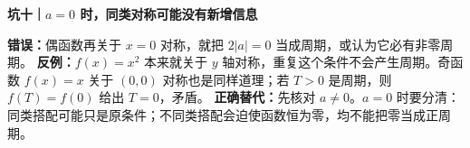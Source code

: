 \clearpage
\begin{trapbox}
\textbf{坑十｜$a=0$ 时，同类对称可能没有新增信息}


\textbf{错误：}偶函数再关于 $x=0$ 对称，就把 $2|a|=0$ 当成周期，或认为它必有非零周期。
\textbf{反例：}$f(x)=x^2$ 本来就关于 $y$ 轴对称，重复这个条件不会产生周期。奇函数 $f(x)=x$ 关于 $(0,0)$ 对称也是同样道理；若 $T>0$ 是周期，则 $f(T)=f(0)$ 给出 $T=0$，矛盾。
\textbf{正确替代：}先核对 $a\ne0$。$a=0$ 时要分清：同类搭配可能只是原条件；不同类搭配会迫使函数恒为零，均不能把零当成正周期。

\end{trapbox}
